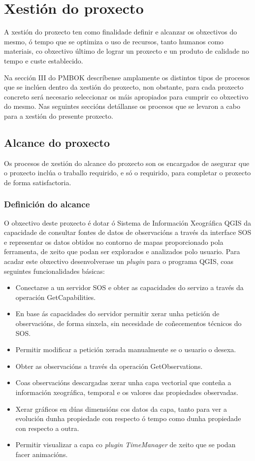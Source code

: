 \chapter{Xestión do proxecto}
A xestión do proxecto ten como finalidade definir e alcanzar os obxectivos do mesmo, ó tempo que se optimiza o uso de recursos, tanto humanos como materiais, co obxectivo último de lograr un proxecto e un produto de calidade no tempo e custe establecido.

Na sección III do PMBOK\cite{PMBOK} descríbense amplamente os distintos tipos de procesos que se inclúen dentro da xestión do proxecto, non obstante, para cada proxecto concreto será necesario seleccionar os máis apropiados para cumprir co obxectivo do mesmo. Nas seguintes seccións detállanse os procesos que se levaron a cabo para a xestión do presente proxecto.

\section{Alcance do proxecto}
Os procesos de xestión do alcance do proxecto son os encargados de asegurar que o proxecto inclúa o traballo requirido, e só o requirido, para completar o proxecto de forma satisfactoria.

\subsection{Definición do alcance}\label{subsec:DefAlcance}
O obxectivo deste proxecto é dotar ó Sistema de Información Xeográfica QGIS da capacidade de consultar fontes de datos de observacións a través da interface SOS e representar os datos obtidos no contorno de mapas proporcionado pola ferramenta, de xeito que podan ser explorados e analizados polo usuario. Para acadar este obxectivo desenvolverase un \emph{plugin} para o programa QGIS, coas seguintes funcionalidades básicas:

\begin{itemize}
\item Conectarse a un servidor SOS e obter as capacidades do servizo a través da operación GetCapabilities.
\item En base ás capacidades do servidor permitir xerar unha petición de observacións, de forma sinxela, sin necesidade de coñecementos técnicos do SOS.
\item Permitir modificar a petición xerada manualmente se o usuario o desexa.
\item Obter as observacións a través da operación GetObservations.
\item Coas observacións descargadas xerar unha capa vectorial que conteña a información xeográfica, temporal e os valores das propiedades observadas.
\item Xerar gráficos en dúas dimensións cos datos da capa, tanto para ver a evolución dunha propiedade con respecto ó tempo como dunha propiedade con respecto a outra.
\item Permitir visualizar a capa co \emph{plugin} \emph{TimeManager} de xeito que se podan facer animacións.
\end{itemize}

